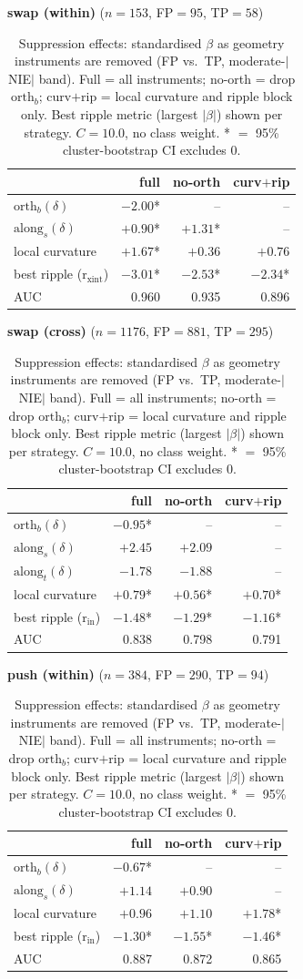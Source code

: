 \begin{table}[t]
\centering
\caption{Suppression effects: standardised $\beta$ as geometry instruments are removed (FP vs.\ TP, moderate-$|$NIE$|$ band). Full = all instruments; no-orth = drop $\mathrm{orth}_b$; curv$+$rip = local curvature and ripple block only. Best ripple metric (largest $|\beta|$) shown per strategy. $C=10.0$, no class weight. * $=$ 95\% cluster-bootstrap CI excludes 0.}
\label{tab:fptp-noorth}
\small

\medskip
\textbf{swap (within)} ($n=153$, FP$=95$, TP$=58$)

\begin{tabular}{l r r r}
\toprule
 & full & no-orth & curv$+$rip \\
\midrule
$\mathrm{orth}_b(\delta)$ & $-2.00$* & -- & -- \\
$\mathrm{along}_s(\delta)$ & $+0.90$* & $+1.31$* & -- \\
local curvature & $+1.67$* & $+0.36$ & $+0.76$ \\
best ripple (r$_\mathrm{xint}$) & $-3.01$* & $-2.53$* & $-2.34$* \\
AUC & 0.960 & 0.935 & 0.896 \\
\bottomrule
\end{tabular}

\medskip
\textbf{swap (cross)} ($n=1176$, FP$=881$, TP$=295$)

\begin{tabular}{l r r r}
\toprule
 & full & no-orth & curv$+$rip \\
\midrule
$\mathrm{orth}_b(\delta)$ & $-0.95$* & -- & -- \\
$\mathrm{along}_s(\delta)$ & $+2.45$ & $+2.09$ & -- \\
$\mathrm{along}_t(\delta)$ & $-1.78$ & $-1.88$ & -- \\
local curvature & $+0.79$* & $+0.56$* & $+0.70$* \\
best ripple (r$_\mathrm{in}$) & $-1.48$* & $-1.29$* & $-1.16$* \\
AUC & 0.838 & 0.798 & 0.791 \\
\bottomrule
\end{tabular}

\medskip
\textbf{push (within)} ($n=384$, FP$=290$, TP$=94$)

\begin{tabular}{l r r r}
\toprule
 & full & no-orth & curv$+$rip \\
\midrule
$\mathrm{orth}_b(\delta)$ & $-0.67$* & -- & -- \\
$\mathrm{along}_s(\delta)$ & $+1.14$ & $+0.90$ & -- \\
local curvature & $+0.96$ & $+1.10$ & $+1.78$* \\
best ripple (r$_\mathrm{in}$) & $-1.30$* & $-1.55$* & $-1.46$* \\
AUC & 0.887 & 0.872 & 0.865 \\
\bottomrule
\end{tabular}


\end{table}
